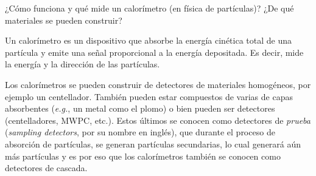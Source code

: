 \documentclass[./../main.tex]{subfiles}
\begin{document}
	\begin{exercise}
		¿Cómo funciona y qué mide un calorímetro (en física de partículas)? ¿De qué materiales se pueden construir?

		\begin{solution}
			Un calorímetro es un dispositivo que absorbe la energía cinética total de una partícula y emite una señal proporcional a la energía depositada. Es decir, mide la energía y la dirección de las partículas.

			Los calorímetros se pueden construir de detectores de materiales homogéneos, por ejemplo un centellador. También pueden estar compuestos de varias de capas absorbentes (\emph{e.g.}, un metal como el plomo) o bien pueden ser detectores (centelladores, MWPC, etc.). Estos últimos se conocen como detectores de \emph{prueba} (\emph{sampling detectors}, por su nombre en inglés), que durante el proceso de absorción de partículas, se generan partículas secundarias, lo cual generará aún más partículas y es por eso que los calorímetros también se conocen como detectores de cascada.
		\end{solution}
	\end{exercise}
\end{document}

